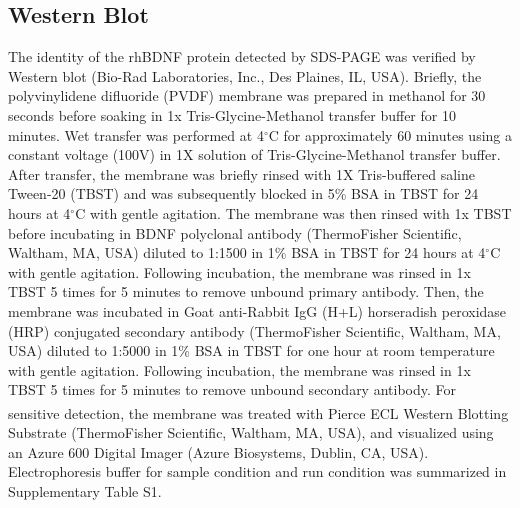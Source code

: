 \documentclass[review]{elsarticle}
\begin{document}
\subsection{Western Blot} 
The identity of the rhBDNF protein detected by SDS-PAGE was verified by Western blot (Bio-Rad Laboratories, Inc., Des Plaines, IL, USA). Briefly, the polyvinylidene difluoride (PVDF) membrane was prepared in methanol for 30 seconds before soaking in 1x Tris-Glycine-Methanol transfer buffer for 10 minutes. Wet transfer was performed at 4$^\circ$C for approximately 60 minutes using a constant voltage (100V) in 1X solution of Tris-Glycine-Methanol transfer buffer. After transfer, the membrane was briefly rinsed with 1X Tris-buffered saline Tween-20 (TBST) and was subsequently blocked in 5\% BSA in TBST for 24 hours at 4$^\circ$C with gentle agitation. The membrane was then rinsed with 1x TBST before incubating in BDNF polyclonal antibody (ThermoFisher Scientific, Waltham, MA, USA) diluted to 1:1500 in 1\% BSA in TBST for 24 hours at 4$^\circ$C with gentle agitation. Following incubation, the membrane was rinsed in 1x TBST 5 times for 5 minutes to remove unbound primary antibody. Then, the membrane was incubated in Goat anti-Rabbit IgG (H+L) horseradish peroxidase (HRP) conjugated secondary antibody (ThermoFisher Scientific, Waltham, MA, USA) diluted to 1:5000 in 1\% BSA in TBST for one hour at room temperature with gentle agitation. Following incubation, the membrane was rinsed in 1x TBST 5 times for 5 minutes to remove unbound secondary antibody. For sensitive detection, the membrane was treated with Pierce\textsuperscript{\texttrademark} ECL Western Blotting Substrate (ThermoFisher Scientific, Waltham, MA, USA), and visualized using an Azure 600 Digital Imager (Azure Biosystems, Dublin, CA, USA). Electrophoresis buffer for sample condition and run condition was summarized in Supplementary Table S1. 
\end{document}

